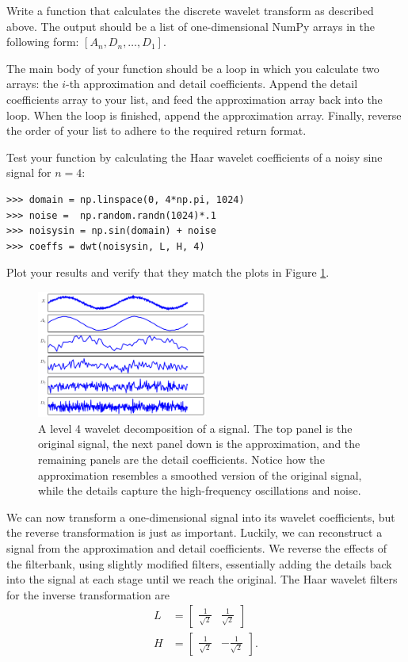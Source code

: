 \begin{problem}
Write a function that calculates the discrete wavelet transform as described above.
The output should be a list of one-dimensional NumPy arrays in the
following form: $[A_n, D_n, \ldots, D_1]$.

The main body of your function should be a loop in which you calculate two arrays: the $i$-th approximation
and detail coefficients. Append the detail coefficients array to your list, and feed the approximation array
back into the loop. When the loop is finished, append the approximation array. Finally, reverse the order of your list
to adhere to the required return format.

Test your function by calculating the Haar wavelet coefficients of a noisy sine signal for $n=4$:

\begin{lstlisting}
>>> domain = np.linspace(0, 4*np.pi, 1024)
>>> noise =  np.random.randn(1024)*.1
>>> noisysin = np.sin(domain) + noise
>>> coeffs = dwt(noisysin, L, H, 4)
\end{lstlisting}

Plot your results and verify that they match the plots in Figure \ref{fig:dwt1D}.
\end{problem}

\begin{figure}[H]
\centering
\includegraphics[width = 0.5\textwidth]{figures/dwt1D}
\caption{A level 4 wavelet decomposition of a signal. The top panel is the original signal,
the next panel down is the approximation, and the remaining panels are the detail coefficients.
Notice how the approximation resembles a smoothed version of the original signal, while the
details capture the high-frequency oscillations and noise.}
\label{fig:dwt1D}
\end{figure}

We can now transform a one-dimensional signal into its wavelet coefficients,
but the reverse transformation is just as important.
Luckily, we can reconstruct a signal from the approximation and detail coefficients.
We reverse the effects of the filterbank, using slightly modified filters, essentially adding the details back into the
signal at each stage until we reach the original.
The Haar wavelet filters for the inverse transformation are
\begin{align*}
L &= \begin{bmatrix}\frac{1}{\sqrt{2}} & \frac{1}{\sqrt{2}}\end{bmatrix}\\
H &= \begin{bmatrix}\frac{1}{\sqrt{2}} & -\frac{1}{\sqrt{2}}\end{bmatrix}.
\end{align*}

